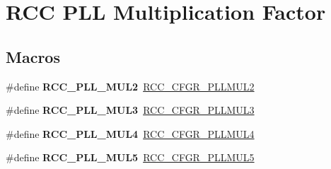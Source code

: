 \hypertarget{group___r_c_c___p_l_l___multiplication___factor}{}\section{R\+CC P\+LL Multiplication Factor}
\label{group___r_c_c___p_l_l___multiplication___factor}
\subsection*{Macros}
\begin{DoxyCompactItemize}
\item 
\mbox{\label{group___r_c_c___p_l_l___multiplication___factor_ga1ebc7b8473983247312ff095c242285f}} 
\#define {\bfseries R\+C\+C\+\_\+\+P\+L\+L\+\_\+\+M\+U\+L2}~\hyperlink{group___peripheral___registers___bits___definition_gabcc53e7555ec8171db162de2bdd30d6f}{R\+C\+C\+\_\+\+C\+F\+G\+R\+\_\+\+P\+L\+L\+M\+U\+L2}
\item 
\mbox{\label{group___r_c_c___p_l_l___multiplication___factor_ga4ee529382af73885706795fd81538781}} 
\#define {\bfseries R\+C\+C\+\_\+\+P\+L\+L\+\_\+\+M\+U\+L3}~\hyperlink{group___peripheral___registers___bits___definition_ga599cf14f159345374d91a96e645b105b}{R\+C\+C\+\_\+\+C\+F\+G\+R\+\_\+\+P\+L\+L\+M\+U\+L3}
\item 
\mbox{\label{group___r_c_c___p_l_l___multiplication___factor_ga2aedc8bc6552d98fb748b58a2379820b}} 
\#define {\bfseries R\+C\+C\+\_\+\+P\+L\+L\+\_\+\+M\+U\+L4}~\hyperlink{group___peripheral___registers___bits___definition_gaf76c27dba3f4be2433fd5a384a1877ae}{R\+C\+C\+\_\+\+C\+F\+G\+R\+\_\+\+P\+L\+L\+M\+U\+L4}
\item 
\mbox{\label{group___r_c_c___p_l_l___multiplication___factor_ga3b2b6019d1b1de880b009ff2a6769f03}} 
\#define {\bfseries R\+C\+C\+\_\+\+P\+L\+L\+\_\+\+M\+U\+L5}~\hyperlink{group___peripheral___registers___bits___definition_gac3eefd08698972d5ed05f76547ccdd93}{R\+C\+C\+\_\+\+C\+F\+G\+R\+\_\+\+P\+L\+L\+M\+U\+L5}
\item 
\mbox{\label{group___r_c_c___p_l_l___multiplication___factor_gae2f8dd748556470dcac6901ac7a3e650}} 

\end{DoxyCompactItemize}

